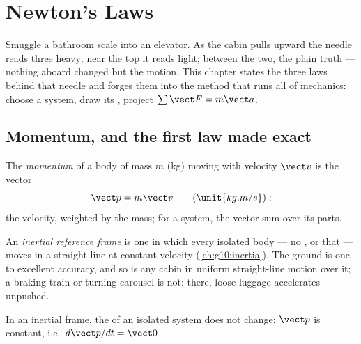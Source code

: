 \chapter{Newton's Laws}\label{ch:g12:newtons-laws}

Smuggle a bathroom scale into an elevator. As the cabin pulls upward the needle reads
three  heavy; near the top it reads light; between the two, the plain truth
--- nothing aboard changed but the motion. This chapter states the three laws behind
that needle and forges them into the method that runs all of mechanics: choose a
system, draw its , project $\sum \vect F = m\vect a$.

\section{Momentum, and the first law made exact}

\begin{definition}[Momentum]\label{def:g12:newtons-laws:momentum}
The \emph{momentum} of a body of mass $m$ (\unit{kg}) moving with
velocity $\vect v$ is the vector
\[
\vect p = m \vect v \qquad (\unit{kg.m/s}):
\]
the velocity, weighted by the mass; for a system, the vector sum over its parts.
\end{definition}

\begin{definition}\label{def:g12:newtons-laws:inertial}
An \emph{inertial reference frame} is one in which
every isolated body --- no , or  that  --- moves in a straight
line at constant velocity (\cref{ch:g10:inertia}). The ground is one to excellent
accuracy, and so is any cabin in uniform straight-line motion over it; a braking
train or turning carousel is not: there, loose luggage accelerates unpushed.
\end{definition}

\begin{theorem}\label{thm:g12:newtons-laws:first}
In an inertial frame, the  of an isolated system does not change: $\vect p$
is constant, i.e.\ $d\vect p/dt = \vect 0$.
\end{theorem}
\admitted


